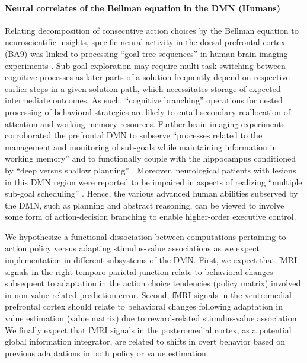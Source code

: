 \documentclass[10pt,letterpaper]{article}
\begin{document}
\paragraph*{Neural correlates of the Bellman equation in the DMN (Humans)}
Relating decomposition of consecutive action choices by the Bellman equation
to neuroscientific insights,
specific neural activity in the dorsal prefrontal cortex (BA9)
was linked to processing ``goal-tree sequences''
in human brain-imaging experiments
\citep{koechlin1999role, koechlin2000dissociating}.
Sub-goal exploration may require multi-task switching
between cognitive processes
as later parts of a solution
frequently depend on respective earlier steps in a given solution path, which
necessitates storage of expected intermediate outcomes.
As such,
``cognitive branching'' operations for nested processing of behavioral strategies
are likely to
entail secondary reallocation of attention and working-memory resources.
Further brain-imaging experiments corroborated
the prefrontal DMN to subserve
``processes related to the management and monitoring of sub-goals while
maintaining information in working memory''
\citep{braver2002role}
and to functionally couple with the hippocampus conditioned by ``deep versus shallow planning''
\citep{kaplan2017neural}.
%
Moreover,
neurological patients with lesions in this DMN region were reported
to be impaired in aspects of realizing ``multiple sub-goal scheduling''
\citep{burgess2000cognitive}.
Hence,
the various advanced human abilities subserved by the DMN, such as
planning and abstract reasoning, can be viewed to involve some form of
action-decision branching to enable higher-order executive control.

We hypothesize a functional dissociation between computations pertaining to action policy versus adapting stimulus-value associations as we expect implementation in different subsystems of the DMN. First, we expect that fMRI signals in the right temporo-parietal junction relate to behavioral changes subsequent to adaptation in the action choice tendencies (policy matrix) involved in non-value-related prediction error. Second, fMRI signals in the ventromedial prefrontal cortex should relate to behavioral changes following adaptation in value estimation (value matrix) due to reward-related stimulus-value association. We finally expect that fMRI signals in the posteromedial cortex, as a potential global information integrator, are related to shifts in overt behavior based on previous adaptations in both policy or value estimation.
\end{document}
